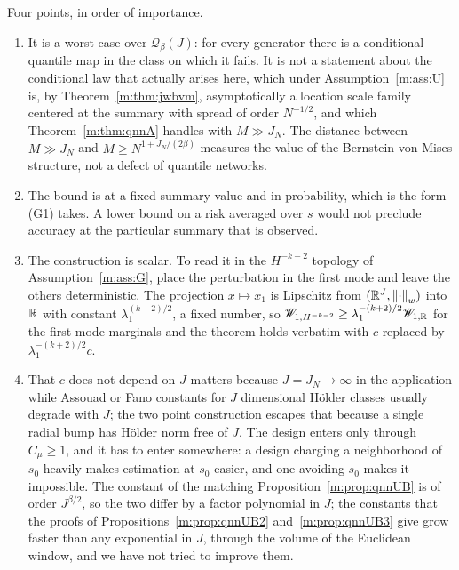 \begin{remark}\label{m:rem:qnnB}
Four points, in order of importance.
\begin{enumerate}[label=(\roman*),nosep]
\item It is a worst case over $\mathcal Q_\beta(J)$: for every generator there is a conditional quantile map in the class on which it fails. It is not a statement about the conditional law that actually arises here, which under Assumption~\ref{m:ass:U} is, by Theorem~\ref{m:thm:jwbvm}, asymptotically a location scale family centered at the summary with spread of order $N^{-1/2}$, and which Theorem~\ref{m:thm:qnnA} handles with $M\gg J_N$. The distance between $M\gg J_N$ and $M\ge N^{1+J_N/(2\beta)}$ measures the value of the Bernstein von Mises structure, not a defect of quantile networks.
\item The bound is at a fixed summary value and in probability, which is the form (G1) takes. A lower bound on a risk averaged over $s$ would not preclude accuracy at the particular summary that is observed.
\item The construction is scalar. To read it in the $H^{-k-2}$ topology of Assumption~\ref{m:ass:G}, place the perturbation in the first mode and leave the others deterministic. The projection $x\mapsto x_1$ is Lipschitz from $(\mathbb{R}^J,\left\|\cdot\right\|_w)$ into $\mathbb{R}$ with constant $\lambda_1^{(k+2)/2}$, a fixed number, so $\mathscr{W}_{1,H^{-k-2}}\ge\lambda_1^{-(k+2)/2}\mathscr{W}_{1,\mathbb{R}}$ for the first mode marginals and the theorem holds verbatim with $c$ replaced by $\lambda_1^{-(k+2)/2}c$.
\item That $c$ does not depend on $J$ matters because $J=J_N\to\infty$ in the application while Assouad or Fano constants for $J$ dimensional H\"older classes usually degrade with $J$; the two point construction escapes that because a single radial bump has H\"older norm free of $J$. The design enters only through $C_\mu\ge1$, and it has to enter somewhere: a design charging a neighborhood of $s_0$ heavily makes estimation at $s_0$ easier, and one avoiding $s_0$ makes it impossible. The constant of the matching Proposition~\ref{m:prop:qnnUB} is of order $J^{\beta/2}$, so the two differ by a factor polynomial in $J$; the constants that the proofs of Propositions~\ref{m:prop:qnnUB2} and~\ref{m:prop:qnnUB3} give grow faster than any exponential in $J$, through the volume of the Euclidean window, and we have not tried to improve them.
\end{enumerate}
\end{remark}

